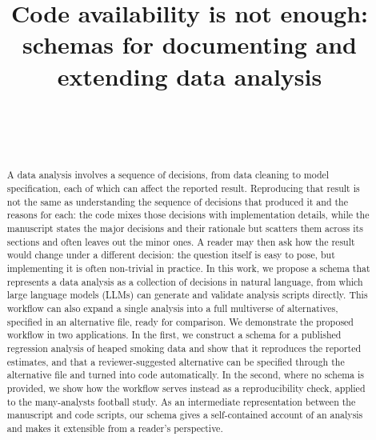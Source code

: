 \documentclass[aoas]{imsart}
\begin{document}
\begin{frontmatter}
\title{Code availability is not enough: schemas for documenting and
extending data analysis}

\begin{aug}
\author[1]{~}
\author[1]{~}
\address[1]{Department of Statistics and Data Science,\\ University of
Texas at Austin}
\end{aug}

\begin{abstract}
A data analysis involves a sequence of decisions, from data cleaning to
model specification, each of which can affect the reported result.
Reproducing that result is not the same as understanding the sequence of
decisions that produced it and the reasons for each: the code mixes
those decisions with implementation details, while the manuscript states
the major decisions and their rationale but scatters them across its
sections and often leaves out the minor ones. A reader may then ask how
the result would change under a different decision: the question itself
is easy to pose, but implementing it is often non-trivial in practice.
In this work, we propose a schema that represents a data analysis as a
collection of decisions in natural language, from which large language
models (LLMs) can generate and validate analysis scripts directly. This
workflow can also expand a single analysis into a full multiverse of
alternatives, specified in an alternative file, ready for comparison. We
demonstrate the proposed workflow in two applications. In the first, we
construct a schema for a published regression analysis of heaped smoking
data and show that it reproduces the reported estimates, and that a
reviewer-suggested alternative can be specified through the alternative
file and turned into code automatically. In the second, where no schema
is provided, we show how the workflow serves instead as a
reproducibility check, applied to the many-analysts football study. As
an intermediate representation between the manuscript and code scripts,
our schema gives a self-contained account of an analysis and makes it
extensible from a reader's perspective.
\end{abstract}

\begin{keyword}
\end{keyword}
\end{frontmatter}
\end{document}
